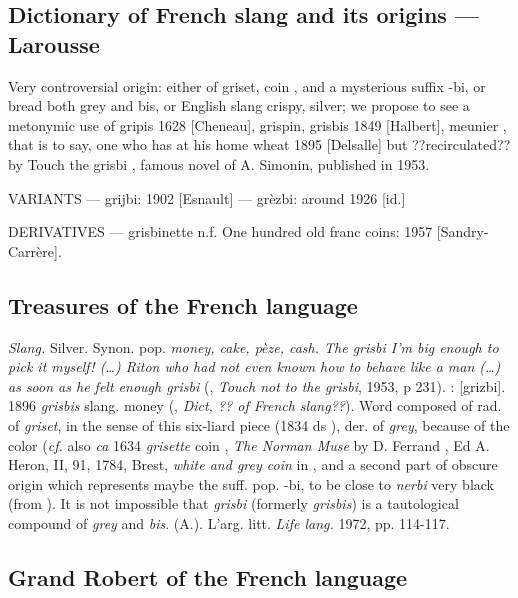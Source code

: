 \subsection*{Dictionary of French slang and its origins --- Larousse}

Very controversial origin: either of griset, \og coin \fg, and a
mysterious suffix -bi, or bread both grey and bis, or English slang
crispy, silver; we propose to see a metonymic use of gripis 1628
[Cheneau], grispin, grisbis 1849 [Halbert], \og meunier \fg{}, that is to say, \og one who has at his home wheat \fg{} 1895 [Delsalle] but ??recirculated?? by \og Touch the grisbi \fg{}, famous novel of A. Simonin, published in 1953.

VARIANTS --- grijbi: 1902 [Esnault] --- grèzbi: around 1926 [id.]

DERIVATIVES --- grisbinette n.f. One hundred old franc coins: 1957 [Sandry-Carrère].

\subsection*{Treasures of the French language}

\emph{Slang.} Silver. Synon. pop. \emph{money, cake, pèze, cash. The grisbi I'm big enough to pick it myself! (\ldots) Riton who had not even known how to behave like a man (\ldots) as soon as he felt enough grisbi} (, \emph{Touch not to the grisbi}, 1953, p 231).
: [grizbi].  1896 \emph{grisbis}
slang. \og money \fg{} (, \emph{Dict, ?? of French slang??}). Word composed of rad. of \emph{griset}, in the sense of this six-liard piece \fg{} (1834 ds ), der. of \emph{grey}, because of the color (\emph{cf.} also \emph{ca} 1634 \emph{grisette} \og coin \fg{}, \emph{The Norman Muse} by D. Ferrand , Ed A. Heron, II, 91, 1784, Brest, \emph{white and grey coin} in , and a second part of obscure origin which represents maybe the suff. pop. -bi, to be close to \emph{nerbi} \og very black \fg{} (from ). It is not impossible that \emph{grisbi} (formerly \emph{grisbis}) is a tautological compound of \emph{grey} and \emph{bis}.
  (A.). L'arg. litt. \emph{Life lang.} 1972, pp. 114-117.

\subsection*{Grand Robert of the French language}

